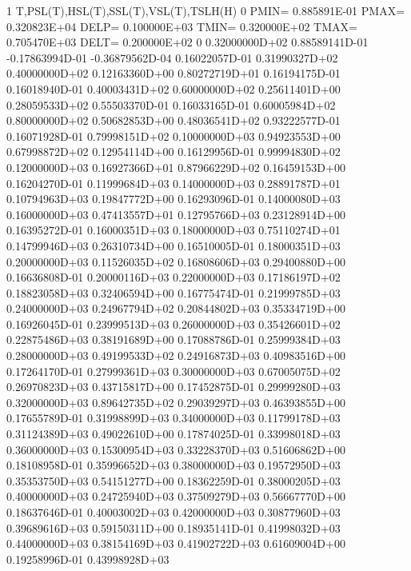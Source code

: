 \begin{DoxyVerb}1          T,PSL(T),HSL(T),SSL(T),VSL(T),TSLH(H)
0         PMIN=    0.885891E-01    PMAX=    0.320823E+04    DELP=    0.100000E+03
          TMIN=    0.320000E+02    TMAX=    0.705470E+03    DELT=    0.200000E+02
0
    0.32000000D+02    0.88589141D-01   -0.17863994D-01   -0.36879562D-04    0.16022057D-01    0.31990327D+02
    0.40000000D+02    0.12163360D+00    0.80272719D+01    0.16194175D-01    0.16018940D-01    0.40003431D+02
    0.60000000D+02    0.25611401D+00    0.28059533D+02    0.55503370D-01    0.16033165D-01    0.60005984D+02
    0.80000000D+02    0.50682853D+00    0.48036541D+02    0.93222577D-01    0.16071928D-01    0.79998151D+02
    0.10000000D+03    0.94923553D+00    0.67998872D+02    0.12954114D+00    0.16129956D-01    0.99994830D+02
    0.12000000D+03    0.16927366D+01    0.87966229D+02    0.16459153D+00    0.16204270D-01    0.11999684D+03
    0.14000000D+03    0.28891787D+01    0.10794963D+03    0.19847772D+00    0.16293096D-01    0.14000080D+03
    0.16000000D+03    0.47413557D+01    0.12795766D+03    0.23128914D+00    0.16395272D-01    0.16000351D+03
    0.18000000D+03    0.75110274D+01    0.14799946D+03    0.26310734D+00    0.16510005D-01    0.18000351D+03
    0.20000000D+03    0.11526035D+02    0.16808606D+03    0.29400880D+00    0.16636808D-01    0.20000116D+03
    0.22000000D+03    0.17186197D+02    0.18823058D+03    0.32406594D+00    0.16775474D-01    0.21999785D+03
    0.24000000D+03    0.24967794D+02    0.20844802D+03    0.35334719D+00    0.16926045D-01    0.23999513D+03
    0.26000000D+03    0.35426601D+02    0.22875486D+03    0.38191689D+00    0.17088786D-01    0.25999384D+03
    0.28000000D+03    0.49199533D+02    0.24916873D+03    0.40983516D+00    0.17264170D-01    0.27999361D+03
    0.30000000D+03    0.67005075D+02    0.26970823D+03    0.43715817D+00    0.17452875D-01    0.29999280D+03
    0.32000000D+03    0.89642735D+02    0.29039297D+03    0.46393855D+00    0.17655789D-01    0.31998899D+03
    0.34000000D+03    0.11799178D+03    0.31124389D+03    0.49022610D+00    0.17874025D-01    0.33998018D+03
    0.36000000D+03    0.15300954D+03    0.33228370D+03    0.51606862D+00    0.18108958D-01    0.35996652D+03
    0.38000000D+03    0.19572950D+03    0.35353750D+03    0.54151277D+00    0.18362259D-01    0.38000205D+03
    0.40000000D+03    0.24725940D+03    0.37509279D+03    0.56667770D+00    0.18637646D-01    0.40003002D+03
    0.42000000D+03    0.30877960D+03    0.39689616D+03    0.59150311D+00    0.18935141D-01    0.41998032D+03
    0.44000000D+03    0.38154169D+03    0.41902722D+03    0.61609004D+00    0.19258996D-01    0.43998928D+03

\end{DoxyVerb}
